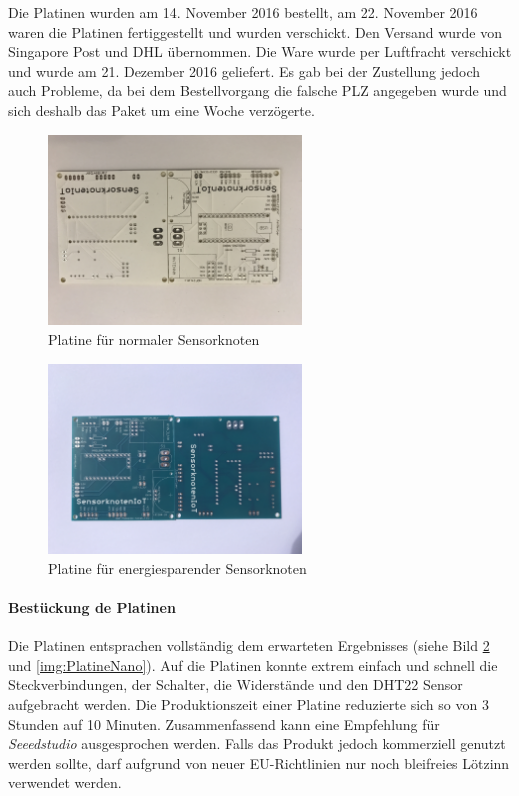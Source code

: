 Die Platinen wurden am 14. November 2016 bestellt, am 22. November 2016 waren die Platinen fertiggestellt und wurden verschickt. Den Versand wurde von Singapore Post und DHL übernommen. Die Ware wurde per Luftfracht verschickt und wurde am 21. Dezember 2016 geliefert. Es gab bei der Zustellung jedoch auch Probleme, da bei dem Bestellvorgang die falsche PLZ angegeben wurde und sich deshalb das Paket um eine Woche verzögerte.
\begin{figure}
	\centering
	\includegraphics[width=0.6\textwidth]{bilder/platineArduinoNano}
	\caption{Platine für normaler Sensorknoten}
	\label{img:PlatineArduinoNano}
\end{figure}
\begin{figure}
	\centering
	\includegraphics[width=0.6\textwidth]{bilder/platineArduinoProMini}
	\caption{Platine für energiesparender Sensorknoten}
	\label{img:PlatineArduinoProMini}
\end{figure}

\paragraph{Bestückung de Platinen} Die Platinen entsprachen vollständig dem erwarteten Ergebnisses (siehe Bild \ref{img:PlatineArduinoProMini} und \ref{img:PlatineNano}). Auf die Platinen konnte extrem einfach und schnell die Steckverbindungen, der Schalter, die Widerstände und den DHT22 Sensor aufgebracht werden. Die Produktionszeit einer Platine reduzierte sich so von 3 Stunden auf 10 Minuten. Zusammenfassend kann eine Empfehlung für \textit{Seeedstudio} ausgesprochen werden. Falls das Produkt jedoch kommerziell genutzt werden sollte, darf aufgrund von neuer EU-Richtlinien nur noch bleifreies Lötzinn verwendet werden. 
